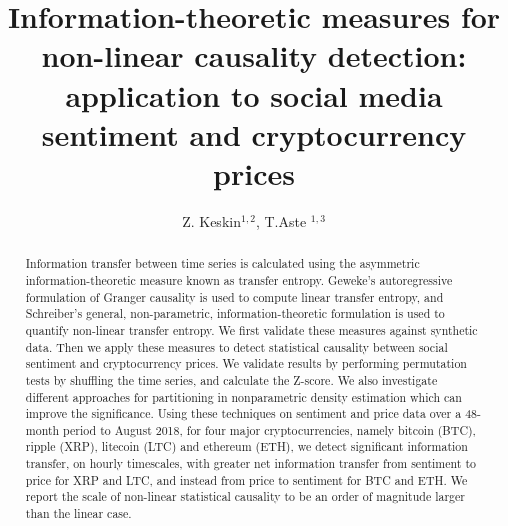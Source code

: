 \documentclass[]{rsos}%
\begin{document}
\title{Information-theoretic measures for non-linear causality detection: \\ application to social media sentiment and cryptocurrency prices}

\author{%
Z. Keskin$^{1,2}$, T.Aste $^{1,3}$}

\address{$^{1}$Department of Computer Science \& Centre for Blockchain Technologies, University College London, Gower Street, WC1E 6EA, London, United Kingdom.\\
$^{2}$Department of Physics and Astronomy, University College London, Gower Street, WC1E 6EA, London, United Kingdom.
$^3$ UCL Centre for Blockchain Technologies, University College London, London, United Kingdom.}

\subject{Information Theory, Causality, Computational Statistics, Time Series Analysis}
 


\begin{abstract}
    Information transfer between time series is calculated using the asymmetric information-theoretic measure known as transfer entropy. Geweke's autoregressive formulation of Granger causality is used to compute linear transfer entropy, and Schreiber's general, non-parametric, information-theoretic formulation is used to quantify non-linear transfer entropy. 
    We first validate these measures against synthetic data. Then we apply these measures to detect {\color{blue} statistical causality} between social sentiment and cryptocurrency prices. We validate results by performing permutation tests by shuffling the time series, and calculate the Z-score. We also investigate different approaches for partitioning in nonparametric density estimation which can improve the significance. 
    Using these techniques on sentiment and price data over a 48-month period to August 2018, for four major cryptocurrencies, namely bitcoin (BTC), ripple (XRP), litecoin (LTC) and ethereum (ETH), we detect significant information transfer, on hourly timescales, with greater net information transfer from sentiment to price for XRP and LTC, and instead from price to sentiment for BTC and ETH. We report the scale of non-linear {\color{blue}statistical causality} to be an order of magnitude larger than {\color{blue}the linear case}.
\end{abstract}
\end{document}
